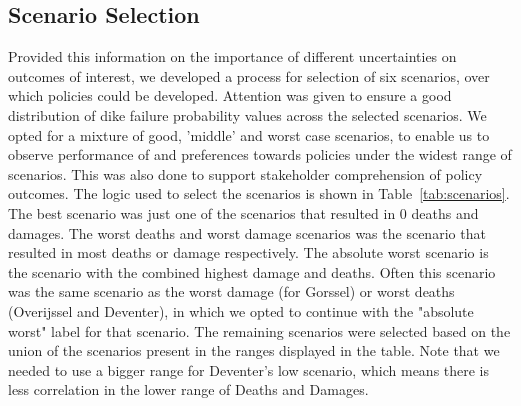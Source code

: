 \subsection{Scenario Selection}
Provided this information on the importance of different uncertainties on outcomes of interest, we developed a process for selection of six scenarios, over which policies could be developed. Attention was given to ensure a good distribution of dike failure probability values across the selected scenarios. We opted for a mixture of good, 'middle' and worst case scenarios, to enable us to observe performance of and preferences towards policies under the widest range of scenarios. This was also done to support stakeholder comprehension of policy outcomes. The logic used to select the scenarios is shown in Table~\ref{tab:scenarios}. The best scenario was just one of the scenarios that resulted in 0 deaths and damages. The worst deaths and worst damage scenarios was the scenario that resulted in most deaths or damage respectively. The absolute worst scenario is the scenario with the combined highest damage and deaths. Often this scenario was the same scenario as the worst damage (for Gorssel) or worst deaths (Overijssel and Deventer), in which we opted to continue with the "absolute worst" label for that scenario. The remaining scenarios were selected based on the union of the scenarios present in the ranges displayed in the table. Note that we needed to use a bigger range for Deventer's low scenario, which means there is less correlation in the lower range of Deaths and Damages.


